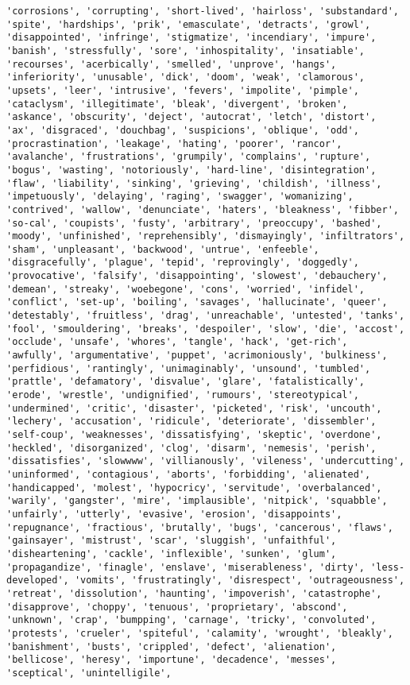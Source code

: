 \documentclass[11pt]{article}
\begin{document}
\begin{Verbatim}[commandchars=\\\{\}]
'corrosions', 'corrupting', 'short-lived', 'hairloss', 'substandard', 'spite', 'hardships', 'prik', 'emasculate', 'detracts', 'growl', 'disappointed', 'infringe', 'stigmatize', 'incendiary', 'impure', 'banish', 'stressfully', 'sore', 'inhospitality', 'insatiable', 'recourses', 'acerbically', 'smelled', 'unprove', 'hangs', 'inferiority', 'unusable', 'dick', 'doom', 'weak', 'clamorous', 'upsets', 'leer', 'intrusive', 'fevers', 'impolite', 'pimple', 'cataclysm', 'illegitimate', 'bleak', 'divergent', 'broken', 'askance', 'obscurity', 'deject', 'autocrat', 'letch', 'distort', 'ax', 'disgraced', 'douchbag', 'suspicions', 'oblique', 'odd', 'procrastination', 'leakage', 'hating', 'poorer', 'rancor', 'avalanche', 'frustrations', 'grumpily', 'complains', 'rupture', 'bogus', 'wasting', 'notoriously', 'hard-line', 'disintegration', 'flaw', 'liability', 'sinking', 'grieving', 'childish', 'illness', 'impetuously', 'delaying', 'raging', 'swagger', 'womanizing', 'contrived', 'wallow', 'denunciate', 'haters', 'bleakness', 'fibber', 'so-cal', 'coupists', 'fusty', 'arbitrary', 'preoccupy', 'bashed', 'moody', 'unfinished', 'reprehensibly', 'dismayingly', 'infiltrators', 'sham', 'unpleasant', 'backwood', 'untrue', 'enfeeble', 'disgracefully', 'plague', 'tepid', 'reprovingly', 'doggedly', 'provocative', 'falsify', 'disappointing', 'slowest', 'debauchery', 'demean', 'streaky', 'woebegone', 'cons', 'worried', 'infidel', 'conflict', 'set-up', 'boiling', 'savages', 'hallucinate', 'queer', 'detestably', 'fruitless', 'drag', 'unreachable', 'untested', 'tanks', 'fool', 'smouldering', 'breaks', 'despoiler', 'slow', 'die', 'accost', 'occlude', 'unsafe', 'whores', 'tangle', 'hack', 'get-rich', 'awfully', 'argumentative', 'puppet', 'acrimoniously', 'bulkiness', 'perfidious', 'rantingly', 'unimaginably', 'unsound', 'tumbled', 'prattle', 'defamatory', 'disvalue', 'glare', 'fatalistically', 'erode', 'wrestle', 'undignified', 'rumours', 'stereotypical', 'undermined', 'critic', 'disaster', 'picketed', 'risk', 'uncouth', 'lechery', 'accusation', 'ridicule', 'deteriorate', 'dissembler', 'self-coup', 'weaknesses', 'dissatisfying', 'skeptic', 'overdone', 'heckled', 'disorganized', 'clog', 'disarm', 'nemesis', 'perish', 'dissatisfies', 'slowwww', 'villianously', 'vileness', 'undercutting', 'uninformed', 'contagious', 'aborts', 'forbidding', 'alienated', 'handicapped', 'molest', 'hypocricy', 'servitude', 'overbalanced', 'warily', 'gangster', 'mire', 'implausible', 'nitpick', 'squabble', 'unfairly', 'utterly', 'evasive', 'erosion', 'disappoints', 'repugnance', 'fractious', 'brutally', 'bugs', 'cancerous', 'flaws', 'gainsayer', 'mistrust', 'scar', 'sluggish', 'unfaithful', 'disheartening', 'cackle', 'inflexible', 'sunken', 'glum', 'propagandize', 'finagle', 'enslave', 'miserableness', 'dirty', 'less-developed', 'vomits', 'frustratingly', 'disrespect', 'outrageousness', 'retreat', 'dissolution', 'haunting', 'impoverish', 'catastrophe', 'disapprove', 'choppy', 'tenuous', 'proprietary', 'abscond', 'unknown', 'crap', 'bumpping', 'carnage', 'tricky', 'convoluted', 'protests', 'crueler', 'spiteful', 'calamity', 'wrought', 'bleakly', 'banishment', 'busts', 'crippled', 'defect', 'alienation', 'bellicose', 'heresy', 'importune', 'decadence', 'messes', 'sceptical', 'unintelligile', 
\end{Verbatim}
\end{document}
